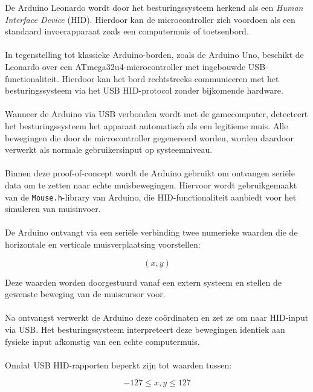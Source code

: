 De Arduino Leonardo wordt door het besturingssysteem herkend als een \textit{Human Interface Device} (HID). Hierdoor kan de microcontroller zich voordoen als een standaard invoerapparaat zoals een computermuis of toetsenbord.
\\\\
In tegenstelling tot klassieke Arduino-borden, zoals de Arduino Uno, beschikt de Leonardo over een ATmega32u4-microcontroller met ingebouwde USB-functionaliteit. Hierdoor kan het bord rechtstreeks communiceren met het besturingssysteem via het USB HID-protocol zonder bijkomende hardware.
\\\\
Wanneer de Arduino via USB verbonden wordt met de gamecomputer, detecteert het besturingssysteem het apparaat automatisch als een legitieme muis. Alle bewegingen die door de microcontroller gegenereerd worden, worden daardoor verwerkt als normale gebruikersinput op systeemniveau.
\\\\
Binnen deze proof-of-concept wordt de Arduino gebruikt om ontvangen seriële data om te zetten naar echte muisbewegingen. Hiervoor wordt gebruikgemaakt van de \texttt{Mouse.h}-library van Arduino, die HID-functionaliteit aanbiedt voor het simuleren van muisinvoer.
\\\\
De Arduino ontvangt via een seriële verbinding twee numerieke waarden die de horizontale en verticale muisverplaatsing voorstellen:

\[
(x, y)
\]

Deze waarden worden doorgestuurd vanaf een extern systeem en stellen de gewenste beweging van de muiscursor voor.
\\\\
Na ontvangst verwerkt de Arduino deze coördinaten en zet ze om naar HID-input via USB. Het besturingssysteem interpreteert deze bewegingen identiek aan fysieke input afkomstig van een echte computermuis.
\\\\
Omdat USB HID-rapporten beperkt zijn tot waarden tussen:

\[
-127 \leq x,y \leq 127
\]

